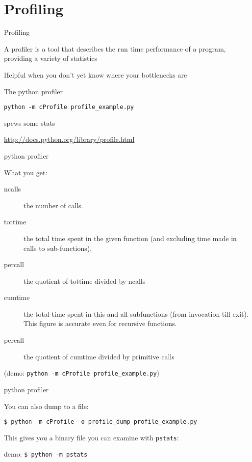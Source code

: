 \documentclass{beamer}
\begin{document}
\section{Profiling}

\begin{frame}[fragile]{Profiling}

{\Large A profiler is a tool that describes the run time performance of a
program, providing a variety of statistics}

\vfill
{\Large Helpful when you don't yet know where your bottlenecks are}

\vfill
{\Large The python profiler}

\begin{verbatim}
python -m cProfile profile_example.py  
\end{verbatim}
{\Large spews some stats}


\vfill
\url{http://docs.python.org/library/profile.html}
\end{frame} 

\begin{frame}[fragile]{python profiler}

{\Large What you get:}

\begin{description}
  \item[ncalls] the number of calls.
  \item[tottime] the total time spent in the given function (and excluding time made in calls to sub-functions),
  \item[percall] the quotient of tottime divided by ncalls
  \item[cumtime] the total time spent in this and all subfunctions (from invocation till exit). This figure is accurate even for recursive functions.
  \item[percall] the quotient of cumtime divided by primitive calls
\end{description}
(demo: \verb|python -m cProfile profile_example.py|)
\end{frame} 

\begin{frame}[fragile]{python profiler}

{\Large You can also dump to a file:}

\vfill
{\verb|$ python -m cProfile -o profile_dump profile_example.py|}

\vfill
{\large This gives you a binary file you can examine with \verb|pstats|:}

\vfill
{demo: \verb|$ python -m pstats|}

\end{frame} 
\end{document}

